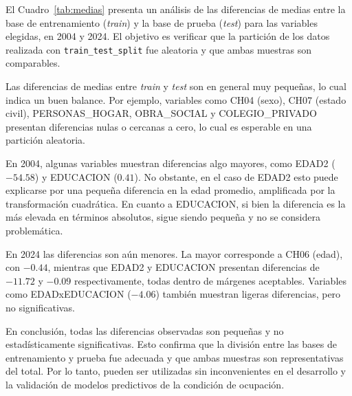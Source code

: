 \documentclass[11pt,a4paper]{article}
\begin{document}
El Cuadro~\ref{tab:medias} presenta un análisis de las diferencias de medias entre la base de
entrenamiento (\textit{train}) y la base de prueba (\textit{test}) para las variables
elegidas, en 2004 y 2024. El objetivo es verificar que la partición de los datos realizada
con \texttt{train\_test\_split} fue aleatoria y que ambas muestras son comparables.

Las diferencias de medias entre \textit{train} y \textit{test} son en general muy pequeñas,
lo cual indica un buen balance. Por ejemplo, variables como CH04 (sexo), CH07 (estado civil),
PERSONAS\_HOGAR, OBRA\_SOCIAL y COLEGIO\_PRIVADO presentan diferencias nulas o cercanas a
cero, lo cual es esperable en una partición aleatoria.

En 2004, algunas variables muestran diferencias algo mayores, como EDAD2 ($-54.58$) y
EDUCACION ($0.41$). No obstante, en el caso de EDAD2 esto puede explicarse por una pequeña
diferencia en la edad promedio, amplificada por la transformación cuadrática. En cuanto a
EDUCACION, si bien la diferencia es la más elevada en términos absolutos, sigue siendo pequeña
y no se considera problemática.

En 2024 las diferencias son aún menores. La mayor corresponde a CH06 (edad), con $-0.44$,
mientras que EDAD2 y EDUCACION presentan diferencias de $-11.72$ y $-0.09$ respectivamente,
todas dentro de márgenes aceptables. Variables como EDADxEDUCACION ($-4.06$) también muestran
ligeras diferencias, pero no significativas.

En conclusión, todas las diferencias observadas son pequeñas y no estadísticamente
significativas. Esto confirma que la división entre las bases de entrenamiento y prueba fue
adecuada y que ambas muestras son representativas del total. Por lo tanto, pueden ser
utilizadas sin inconvenientes en el desarrollo y la validación de modelos predictivos de la
condición de ocupación.
\end{document}
